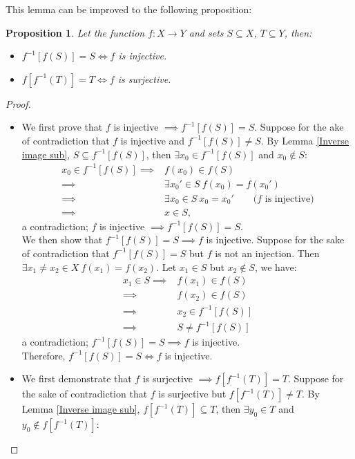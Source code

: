 \documentclass[a4paper]{book}
\newtheorem*{proof}{\textit{Proof.}}
\theoremstyle{break}
\newtheorem{proposition}{Proposition}[section]
\begin{document}
			This lemma can be improved to the following proposition:
			\begin{proposition}
				Let the function $f:X\to Y$ and sets $S\subseteq X$, $T\subseteq Y$, then:
				\begin{itemize}
					\item $f^{-1}[f(S)]=S\iff f$ is injective.
					\item $f[f^{-1}(T)]=T\iff f$ is surjective.
				\end{itemize}
			\end{proposition}
			\begin{proof}~
				\begin{itemize}
					\item We first prove that $f$ is injective $\implies f^{-1}[f(S)]=S$. Suppose for the ake of contradiction that $f$ is injective and $f^{-1}[f(S)]\neq S$. By Lemma \ref{Inverse image sub}, $S\subseteq f^{-1}[f(S)]$, then $\exists x_0\in f^{-1}[f(S)]$ and $x_0\notin S$:
					\begin{align*}
						x_0\in f^{-1}[f(S)]\implies &f(x_0)\in f(S)\\
						\implies &\exists x_0'\in S~f(x_0)=f(x_0')\\
						\implies &\exists x_0\in S~x_0=x_0'\qquad\text{($f$ is injective)}\\
						\implies &x\in S,
					\end{align*}
					a contradiction; $f$ is injective $\implies f^{-1}[f(S)]=S$.\\
					We then show that $f^{-1}[f(S)]=S\implies f$ is injective. Suppose for the sake of contradiction that $f^{-1}[f(S)]=S$ but $f$ is not an injection. Then $\exists x_1\neq x_2\in X~f(x_1)=f(x_2)$. Let $x_1\in S$ but $x_2\notin S$, we have:
					\begin{align*}
						x_1\in S\implies & f(x_1)\in f(S)\\
						\implies & f(x_2)\in f(S)\\
						\implies & x_2\in f^{-1}[f(S)]\\
						\implies & S\neq f^{-1}[f(S)]
					\end{align*}
					a contradiction; $f^{-1}[f(S)]=S\implies f$ is injective.\\
					Therefore, $f^{-1}[f(S)]=S\iff f$ is injective.
					\item We first demonstrate that $f$ is surjective $\implies f[f^{-1}(T)]=T$. Suppose for the sake of contradiction that $f$ is surjective but $f[f^{-1}(T)]\neq T$. By Lemma \ref{Inverse image sub}, $f[f^{-1}(T)]\subseteq T$, then $\exists y_0\in T$ and $y_0\notin f[f^{-1}(T)]$:

\end{itemize}
\end{proof}
\end{document}
